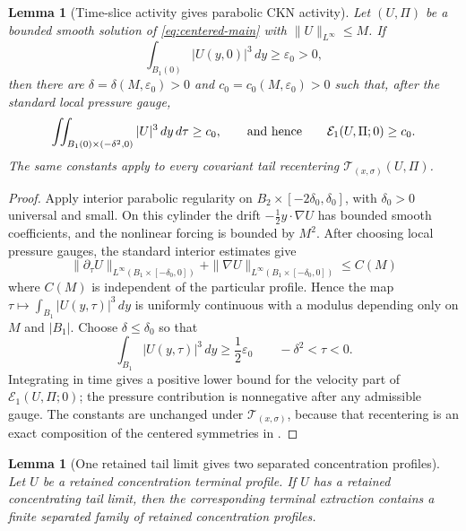 \documentclass[11pt]{amsart}
\numberwithin{equation}{section}
\theoremstyle{plain}
\newtheorem{lemma}[theorem]{Lemma}
\theoremstyle{definition}
\theoremstyle{remark}
\newcommand{\eps}{\varepsilon}
\newcommand{\calE}{\mathcal E}
\begin{document}
\begin{lemma}[Time-slice activity gives parabolic CKN activity]
\label{lem:timeslice-to-ckn-activity}
Let \((U,\Pi)\) be a bounded smooth solution of \eqref{eq:centered-main} with
\(\|U\|_{L^\infty}\le M\).  If
\[
   \int_{B_1(0)}|U(y,0)|^3\,dy\ge\eps_0>0,
\]
then there are \(\delta=\delta(M,\eps_0)>0\) and
\(c_0=c_0(M,\eps_0)>0\) such that, after the standard local pressure gauge,
\[
   \iint_{B_1(0)\times(-\delta^2,0)} |U|^3\,dy\,d\tau
   \ge c_0,
   \qquad\hbox{and hence}\qquad
   \calE_1(U,\Pi;0)\ge c_0 .
\]
The same constants apply to every covariant tail recentering
\(\mathscr T_{(x,\sigma)}(U,\Pi)\).
\end{lemma}

\begin{proof}
Apply interior parabolic regularity on \(B_2\times[-2\delta_0,\delta_0]\),
with \(\delta_0>0\) universal and small.  On this cylinder the drift
\(-\frac12y\cdot\nabla U\) has bounded smooth coefficients, and the nonlinear
forcing is bounded by \(M^2\).  After choosing local pressure gauges, the
standard interior estimates give
\[
   \|\partial_\tau U\|_{L^\infty(B_1\times[-\delta_0,0])}
   +\|\nabla U\|_{L^\infty(B_1\times[-\delta_0,0])}
   \le C(M)
\]
where \(C(M)\) is independent of the particular profile.  Hence the map
\(\tau\mapsto \int_{B_1}|U(y,\tau)|^3\,dy\) is uniformly continuous with a
modulus depending only on \(M\) and \(|B_1|\).  Choose
\(\delta\le\delta_0\) so that
\[
   \int_{B_1}|U(y,\tau)|^3\,dy\ge \frac12\eps_0
   \qquad -\delta^2<\tau<0 .
\]
Integrating in time gives a positive lower bound for the velocity part of
\(\calE_1(U,\Pi;0)\); the pressure contribution is nonnegative after any
admissible gauge.  The constants are unchanged under
\(\mathscr T_{(x,\sigma)}\), because that recentering is an exact composition of
the centered symmetries in .
\end{proof}

\begin{lemma}[One retained tail limit gives two separated concentration profiles]
\label{lem:descendant-to-separated-family}
Let \(U\) be a retained concentration terminal profile.  If \(U\) has a
retained concentrating tail limit, then the corresponding terminal extraction contains a
finite separated family of retained concentration profiles.
\end{lemma}
\end{document}
